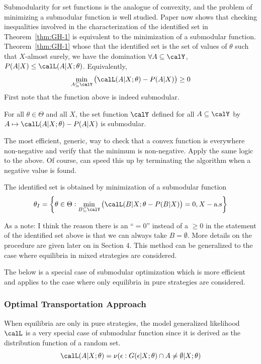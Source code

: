 Submodularity for set functions is the analogue of convexity, and the problem of minimizing a submodular function is well studied. Paper now shows that checking inequalities involved in the characterization of the identified set in Theorem~\ref{thm:GH-1} is equivalent to the minimization of a submodular function. Theorem~\ref{thm:GH-1} whose that the identified set is the set of values of $\theta$ such that $X$-almost surely, we have the domination $\forall A\subseteq \calY$, $P(A|X) \leq \calL(A|X;\theta)$. Equivalently,
\[\min_{A\subseteq\calY}\left(\calL(A|X;\theta) - P(A|X) \right) \geq 0\]
First note that the function above is indeed submodular.
\begin{lemma}
 	\label{lemma:GH-1}
	For all $\theta \in \Theta$ and all $X$, the set function $\calY$ defined for all $A\subseteq\calY$ by $A\mapsto \calL(A|X;\theta) - P(A|X)$ is submodular.
\end{lemma}
 The most efficient, generic, way to check that a convex function is everywhere non-negative and verify that the minimum is non-negative. Apply the same logic to the above. Of course, can speed this up by terminating the algorithm when a negative value is found.

 \begin{theorem}
	\label{thm:GH-2}
	The identified set is obtained by minimization of a submodular function
	\[\theta_I = \left\{\theta \in \Theta: \min_{B\subseteq\calY} \left(\calL(B|X;\theta - P(B|X)\right)= 0, X-\text{a.s}\right\}\]
 \end{theorem}

As a note: I think the reason there is an ``$=0$'' instead of a $\geq 0$ in the statement of the identified set above is that we can always take $B=\emptyset$. More details on the procedure are given later on in Section 4. This method can be generalized to the case where equilibria in mixed strategies are considered.

The below is a special case of submodular optimization which is more efficient and applies to the case where only equilibria in pure strategies are considered.

\subsubsection{Optimal Transportation Approach}

When equilibria are only in pure strategies, the model generalized likelihood $\calL$ is a very special case of submodular function since it is derived as the distribution function of a random set.
\[\calL(A|X;\theta) = \nu(\epsilon: G(\epsilon | X;\theta) \cap A \neq \emptyset| X;\theta)\]

